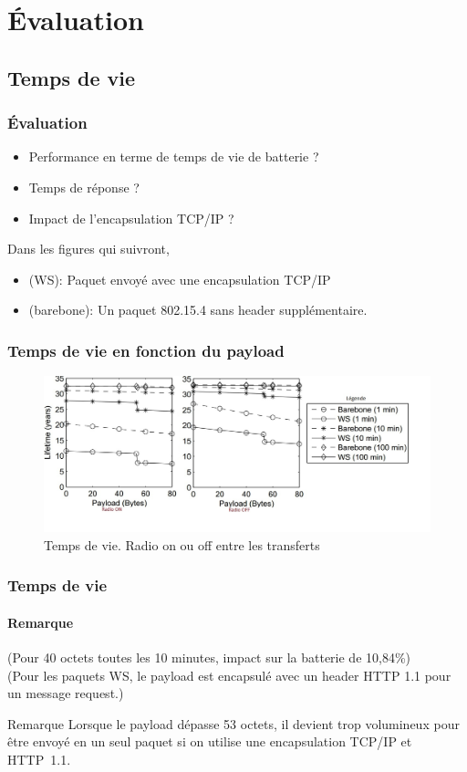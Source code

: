 \section{Évaluation}
\subsection{Temps de vie}
\begin{frame}
\frametitle{Évaluation}
\begin{itemize}
 \item Performance en terme de temps de vie de batterie ?
 \item Temps de réponse ?
 \item Impact de l'encapsulation TCP/IP ?
\end{itemize}
\vspace{5mm}
Dans les figures qui suivront,
\begin{itemize}
 \item (WS): Paquet envoyé avec une encapsulation TCP/IP %
 \item (barebone): Un paquet 802.15.4 sans header supplémentaire.
\end{itemize}
\end{frame}

\begin{frame}
 \frametitle{Temps de vie en fonction du payload}
 \begin{figure}
  \centering
  \includegraphics[scale=0.35]{figures/tempsvie.jpg}
  \caption{Temps de vie. Radio on ou off entre les transferts}
 \end{figure} 
\end{frame}

\begin{frame}
 \frametitle{Temps de vie}
 \framesubtitle{Remarque}
 (Pour 40 octets toutes les 10 minutes, impact sur la batterie de 10,84\%)\\
 (Pour les paquets WS, le payload est encapsulé avec un header HTTP 1.1 pour un message request.)\\
 \vspace{3mm}
 \begin{block}{Remarque}
  Lorsque le payload dépasse 53 octets, il devient trop volumineux pour être envoyé en un seul paquet si on utilise une encapsulation TCP/IP et HTTP~1.1.
 \end{block}
\end{frame}


